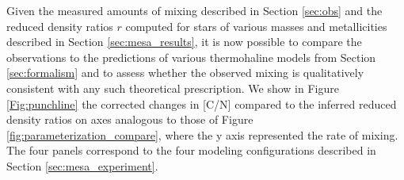 

Given the measured amounts of mixing described in Section \ref{sec:obs} and the reduced density ratios $r$ computed for stars of various masses and metallicities described in Section \ref{sec:mesa_results}, it is now possible to compare the observations to the predictions of various thermohaline models from Section \ref{sec:formalism} and to assess whether the observed mixing is qualitatively consistent with any such theoretical prescription.
%
We show in Figure \ref{Fig:punchline} the corrected changes in [C/N] compared to the inferred reduced density ratios on axes analogous to those of Figure \ref{fig:parameterization_compare}, where the y axis represented the rate of mixing. %
The four panels correspond to the four modeling configurations described in Section \ref{sec:mesa_experiment}. %

